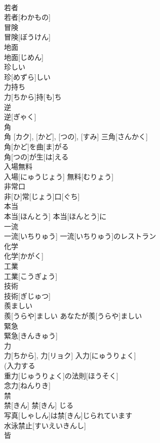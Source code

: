 \documentclass[8pt]{extreport}
\begin{document}
\begin{CJK}{UTF8}{min}
\\	若者	
\\	若者[わかもの]	
\\	冒険	
\\	冒険[ぼうけん]	
\\	地面	
\\	地面[じめん]	
\\	珍しい	
\\	珍[めずら]しい	
\\	力持ち	
\\	力[ちから]持[も]ち	
\\	逆	
\\	逆[ぎゃく]	
\\	角	
\\	角 [カク], [かど], [つの], [すみ]	三角[さんかく] 
\\	角[かど]を曲[ま]がる 
\\	角[つの]が生[は]える 
\\	入場無料	
\\	入場[にゅうじょう] 無料[むりょう]	
\\	非常口	
\\	非[ひ]常[じょう]口[ぐち]	
\\	本当	
\\	本当[ほんとう]	本当[ほんとう]に 
\\	一流	
\\	一流[いちりゅう]	一流[いちりゅう]のレストラン 
\\	化学	
\\	化学[かがく]	
\\	工業	
\\	工業[こうぎょう]	
\\	技術	
\\	技術[ぎじゅつ]	
\\	羨ましい	
\\	羨[うらや]ましい	あなたが羨[うらや]ましい 
\\	緊急	
\\	緊急[きんきゅう]	
\\	力	
\\	力[ちから], 力[リョク]	入力[にゅうりょく] 
\\	(入力する 
\\	重力[じゅうりょく]の法則[ほうそく] 
\\	念力[ねんりき] 
\\	禁	
\\	禁[きん]	禁[きん] じる 
\\	写真[しゃしん]は禁[きん]じられています 
\\	水泳禁止[すいえいきんし] 
\\	皆	

\end{CJK}
\end{document}
